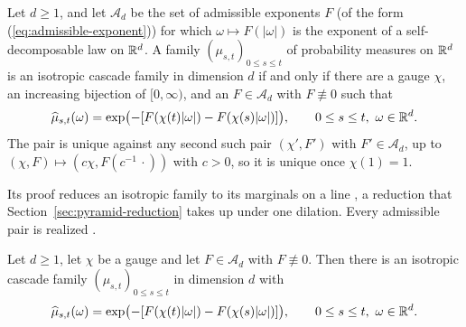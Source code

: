 \begin{theorem}
\label{thm:cited-A31}

Let $d \ge 1$, and let $\mathcal{A}_d$ be the set of admissible exponents $F$ (of the form
(\ref{eq:admissible-exponent})) for which $\omega \mapsto F(|\omega|)$ is the exponent of a
self-decomposable law on $\mathbb{R}^d$. A family $(\mu_{s,t})_{0 \le s \le t}$ of probability measures
on $\mathbb{R}^d$ is an isotropic cascade family in dimension $d$ if and only if there are a gauge
$\chi$, an increasing bijection of $[0,\infty)$, and an $F \in \mathcal{A}_d$ with
$F \not\equiv 0$ such that
\[
  \widehat\mu_{s,t}(\omega) = \exp\bigl(-[F(\chi(t)|\omega|) - F(\chi(s)|\omega|)]\bigr),
  \qquad 0 \le s \le t,\ \omega \in \mathbb{R}^d.
\]
The pair is unique against any second such pair $(\chi', F')$ with $F' \in \mathcal{A}_d$, up to
$(\chi, F) \mapsto (c\chi, F(c^{-1}\,\cdot))$ with $c > 0$, so it is unique once $\chi(1) = 1$.
\end{theorem}

Its proof reduces an isotropic family to its marginals on a line ,
a reduction that Section~\ref{sec:pyramid-reduction} takes up under one dilation. Every admissible
pair is realized .

\begin{theorem}
\label{thm:cited-A34}

Let $d \ge 1$, let $\chi$ be a gauge and let $F \in \mathcal{A}_d$ with $F \not\equiv 0$. Then
there is an isotropic cascade family $(\mu_{s,t})_{0 \le s \le t}$ in dimension $d$ with
\[
  \widehat\mu_{s,t}(\omega) = \exp\bigl(-[F(\chi(t)|\omega|) - F(\chi(s)|\omega|)]\bigr),
  \qquad 0 \le s \le t,\ \omega \in \mathbb{R}^d.
\]
\end{theorem}

